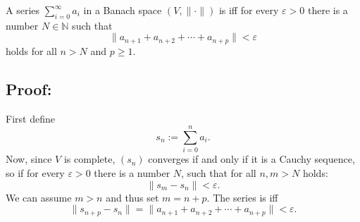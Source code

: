 \documentclass[12pt]{article}
\begin{document}
A series $\sum_{i=0}^\infty a_i$ in a Banach space $(V,\|\cdot\|)$ is  iff for every $\varepsilon>0$ there is a number $N\in\mathbb{N}$ such that
$$\|a_{n+1}+a_{n+2}+\cdots+a_{n+p}\|<\varepsilon$$
holds for all $n>N$ and $p\geq1$.


\subsection*{Proof:}
First define
$$s_n:=\sum_{i=0}^n a_i.$$
Now, since $V$ is complete, $(s_n)$ converges if and only if it is a Cauchy sequence, so if for every $\varepsilon>0$ there is a number $N$, such that for all $n,m>N$ holds:
$$\|s_m-s_n\|<\varepsilon.$$
We can assume $m>n$ and thus set $m=n+p$. The series is  iff
$$\|s_{n+p}-s_n\|=\|a_{n+1}+a_{n+2}+\cdots+a_{n+p}\|<\varepsilon.$$
\end{document}
